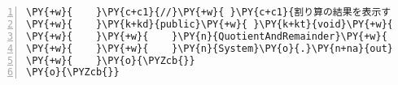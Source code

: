 \begin{Verbatim}[commandchars=\\\{\},numbers=left,firstnumber=1,stepnumber=1,frame=single,fontsize=\small]
\PY{+w}{    }\PY{c+c1}{//}\PY{+w}{ }\PY{c+c1}{割り算の結果を表示する}
\PY{+w}{    }\PY{k+kd}{public}\PY{+w}{ }\PY{k+kt}{void}\PY{+w}{ }\PY{n+nf}{output}\PY{o}{(}\PY{n}{Output}\PY{+w}{ }\PY{n}{output}\PY{o}{)}\PY{+w}{ }\PY{o}{\PYZob{}}
\PY{+w}{    }\PY{+w}{    }\PY{n}{QuotientAndRemainder}\PY{+w}{ }\PY{n}{qar}\PY{+w}{ }\PY{o}{=}\PY{+w}{ }\PY{o}{(}\PY{n}{QuotientAndRemainder}\PY{o}{)}\PY{+w}{ }\PY{n}{output}\PY{o}{;}
\PY{+w}{    }\PY{+w}{    }\PY{n}{System}\PY{o}{.}\PY{n+na}{out}\PY{o}{.}\PY{n+na}{print}\PY{o}{(}\PY{l+s}{"商は"}\PY{+w}{ }\PY{o}{+}\PY{+w}{ }\PY{n}{qar}\PY{o}{.}\PY{n+na}{quotient}\PY{+w}{ }\PY{o}{+}\PY{+w}{ }\PY{l+s}{"で余は"}\PY{+w}{ }\PY{o}{+}\PY{+w}{ }\PY{n}{qar}\PY{o}{.}\PY{n+na}{remainder}\PY{+w}{ }\PY{o}{+}\PY{+w}{ }\PY{l+s}{"です"}\PY{o}{)}\PY{o}{;}
\PY{+w}{    }\PY{o}{\PYZcb{}}
\PY{o}{\PYZcb{}}
\end{Verbatim}
